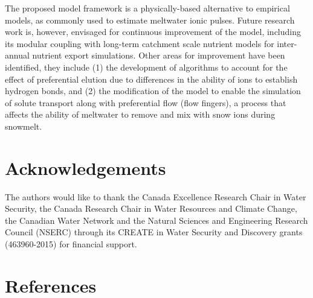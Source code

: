 \documentclass[authoryear,preprint,review,12pt]{elsarticle}
\begin{document}
The proposed model framework is a physically-based alternative to empirical models, as commonly used to estimate meltwater ionic pulses. Future research work is, however, envisaged for continuous improvement of the model, including its modular coupling with long-term catchment scale nutrient models for inter-annual nutrient export simulations. Other areas for improvement have been identified, they include (1) the development of algorithms to account for the effect of preferential elution due to differences in the ability of ions to establish hydrogen bonds, and (2) the modification of the model to enable the simulation of solute transport along with preferential flow (flow fingers), a process that affects the ability of meltwater to remove and mix with snow ions during snowmelt. \par



\section{Acknowledgements}
\label{chapter:aknowledgments}
The authors would like to thank the Canada Excellence Research Chair in Water Security, the Canada Research Chair in Water Resources and Climate Change, the Canadian Water Network and the Natural Sciences and Engineering Research Council (NSERC) through its CREATE in Water Security and Discovery grants (463960-2015) for financial support.
 

\section*{References}


\end{document}
